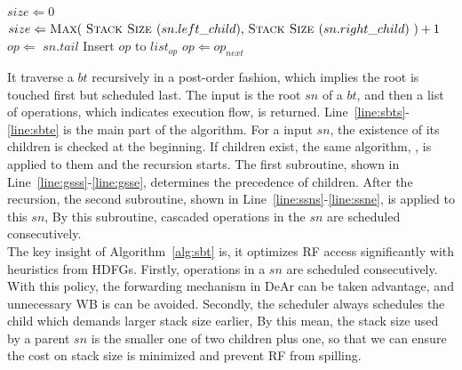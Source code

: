 \documentclass[12pt]{article}
\begin{document}
\begin{CJK}{UTF8}{bkai}
\begin{algorithm}[h]
\begin{algorithmic}[1]
        \label{line:sbte}
        \Statex
      \label{line:gsss}
            \State $size \Leftarrow 0$
        \Else
            \State $size \Leftarrow \text{\textproc{Max}(\ \textproc{Stack Size }($sn.left\_child$), \textproc{Stack Size }($sn.right\_child$)\ )} + 1$
        \EndIf
        \State {}
    \EndFunction                    \label{line:gsse}
    \Statex
      \label{line:ssns}
       \State   $op \Leftarrow$ $sn.tail$
       \Do   
           \State Insert $op$ to $list_{op}$
           \State $op \Leftarrow op_{next}$
    \EndFunction                            \label{line:ssne}

    \end{algorithmic}
    \label{alg:sbt}
\end{algorithm}
        It traverse a $bt$ recursively in a post-order fashion, which implies the root is touched first but scheduled last.
        The input is the root $sn$ of a $bt$, and then a list of operations, which indicates execution flow, is returned.
        Line~\ref{line:sbts}-\ref{line:sbte} is the main part of the algorithm.
        For a input $sn$, the existence of its children is checked at the beginning.
        If children exist, the same algorithm, , is applied to them and the recursion starts.
        The first subroutine,  shown in Line~\ref{line:gsss}-\ref{line:gsse}, determines the precedence of children.
        After the recursion, the second subroutine, 
         shown in Line~\ref{line:ssns}-\ref{line:ssne}, is applied to this $sn$, 
        By this subroutine, cascaded operations in the $sn$ are scheduled consecutively.
        \\\indent
        The key insight of Algorithm~\ref{alg:sbt} is, it optimizes RF access significantly with heuristics from HDFGs.
        Firstly, operations in a $sn$ are scheduled consecutively.
        With this policy, the forwarding mechanism in DeAr can be taken advantage, and unnecessary WB is can be avoided.
        Secondly, the scheduler always schedules the child which demands larger stack size earlier, 
        By this mean, the stack size used by a parent $sn$ is the smaller one of two children plus one, 
        so that we can ensure the cost on stack size is minimized and prevent RF from spilling.
        \\\indent

\end{CJK}
\end{document}
